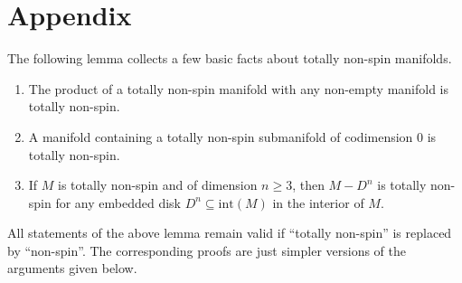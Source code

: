 \appendix
\section{Appendix}

The following lemma collects a few basic facts about totally non-spin manifolds.

\begin{lemma}
    \label{lem:totally_non_spin_lemma} 
    \begin{enumerate}[label=(\roman*)]
        \item The product of a totally non-spin manifold with any non-empty manifold is totally non-spin. \label{eq:totally_non_spin_lemma1}
        \item A manifold containing a totally non-spin submanifold of codimension $0$ is totally non-spin. \label{eq:totally_non_spin_lemma2}
        \item If $M$ is totally non-spin and of dimension $n \geq 3$, then $M - D^n$ is totally non-spin for any embedded disk $D^n \subseteq \mathrm{int}(M)$ in the interior of $M$. \label{eq:totally_non_spin_lemma3}
    \end{enumerate}
\end{lemma}

\begin{remark}
    All statements of the above lemma remain valid if ``totally non-spin'' is replaced by ``non-spin''. The corresponding proofs are just simpler versions of the arguments given below.
\end{remark}

